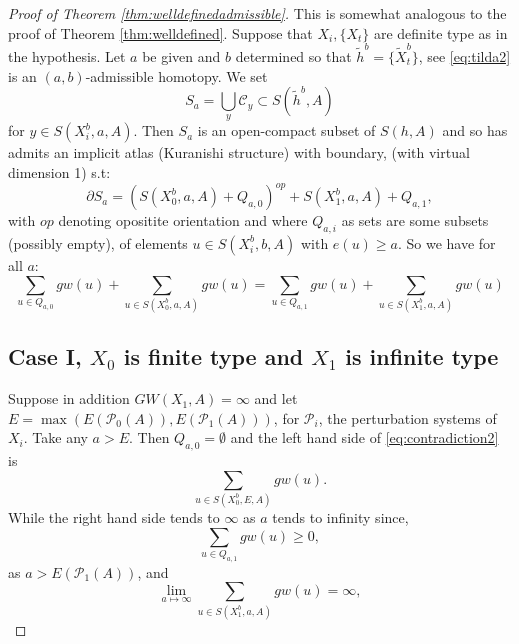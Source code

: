 \documentclass{amsart}
\numberwithin{equation}{section}
\theoremstyle{definition}
\theoremstyle{remark}
\begin{document}
\begin{proof} [Proof of Theorem \ref{thm:welldefinedadmissible}]
This is somewhat analogous to the proof of Theorem \ref{thm:welldefined}. 
Suppose that $X _{i}, \{X _{t} \} $ are  definite type as in the hypothesis.
Let $a$  be given  and $b$ determined so that   $\widetilde{h} ^{b}=  \{\widetilde{X}  ^{b}_t   \} $, see \eqref{eq:tilda2}
is an $(a,b)$-admissible homotopy.
We set $$  S _{a}  = \bigcup _{y} \mathcal{C} _{y} \subset S (\widetilde{h} ^{b},A)  $$ for $y \in S (X ^{b} _{i} ,a, A)$. 
Then $S _{a} $ is an open-compact subset of $S (h,A)$ and so has admits an implicit atlas (Kuranishi structure) with boundary, (with virtual dimension 1) s.t:
\begin{equation*} 
   \partial S _{a} = (S (X ^{b} _{0} , a, A ) + Q _{a,0}) ^{op} +  S (X ^{b} _{1}, a, A ) + Q _{a,1},
\end{equation*}
with $op$ denoting opositite orientation and where $Q _{a,i} $ as sets are some subsets (possibly empty), of elements $u \in S (X ^{b} _{i},b, A)$ with $e (u) \geq a$.
So we have for all $a$:
\begin{equation} \label{eq:contradiction2}
\sum _{u \in Q _{a,0}} gw (u)  + \sum _{u \in S
(X _{0}  ^{b}, a, A)} gw (u) = \sum _{u \in Q _{a,1}} gw (u)  + \sum _{u \in S
(X _{1}  ^{b}, a, A)} gw (u)
\end{equation}
   \subsection {Case I, $X _{0} $ is finite type and $X _{1} $ is infinite type} Suppose in addition $GW (X _{1}, A) = \infty $ and let $E= \max (E (\mathcal{P} _{0} (A)),  E (\mathcal{P} _{1} (A)))$, for $\mathcal{P} _{i} $, the perturbation systems of $X _{i} $. Take any 
$a > E$.
Then $Q _{a,0} = \emptyset $ and the left hand side of \eqref{eq:contradiction2} is
\begin{equation*}
\sum _{u \in S
(X ^{b} _{0} , E, A)} gw (u).
\end {equation*}
While the right hand side tends to $\infty$ as $a$ tends to infinity since,
   \begin{equation*}
\sum _{u  \in Q _{a,1} } gw (u) \geq 0,
\end {equation*}
as $a > E (\mathcal{P} _{1}  (A))$,
and 
\begin {equation*}
\lim _{a \mapsto \infty}  \sum _{u \in 
S (X ^{b} _{1} , a, A)} gw (u) = \infty,
\end{equation*}



\end{proof}
\end{document}
